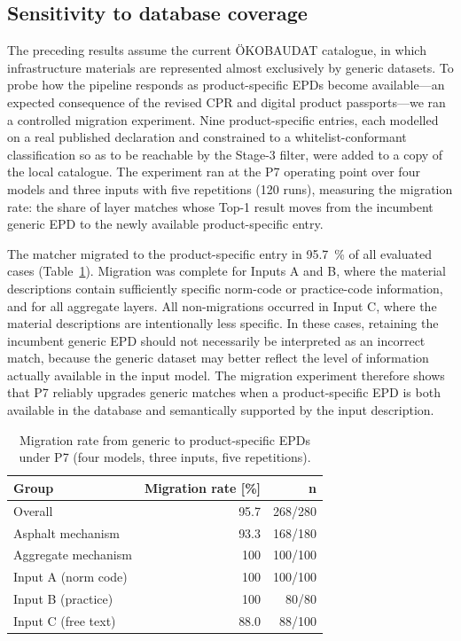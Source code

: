 \documentclass[10pt, a4paper, twocolumn]{article}
\begin{document}
\subsection{Sensitivity to database coverage}
\label{sec:coverage}

The preceding results assume the current \"OKOBAUDAT catalogue, in which
infrastructure materials are represented almost exclusively by generic datasets.
To probe how the pipeline responds as product-specific EPDs become available---an
expected consequence of the revised CPR and digital product passports---we ran a
controlled migration experiment. Nine product-specific entries, each modelled on a
real published declaration and constrained to a whitelist-conformant classification
so as to be reachable by the Stage-3 filter, were added to a copy of the local
catalogue. The experiment ran at the P7 operating point over four models and three
inputs with five repetitions (120 runs), measuring the migration rate: the share of
layer matches whose Top-1 result moves from the incumbent generic EPD to the newly
available product-specific entry.

The matcher migrated to the product-specific entry in 95.7~\% of all evaluated cases (Table~\ref{tab:migration}). Migration was complete for Inputs A and B, where the material descriptions contain sufficiently specific norm-code or practice-code information, and for all aggregate layers. All non-migrations occurred in Input C, where the material descriptions are intentionally less specific. In these cases, retaining the incumbent generic EPD should not necessarily be interpreted as an incorrect match, because the generic dataset may better reflect the level of information actually available in the input model. The migration experiment therefore shows that P7 reliably upgrades generic matches when a product-specific EPD is both available in the database and semantically supported by the input description.


\begin{table}[htbp]
  \caption{Migration rate from generic to product-specific EPDs under P7
           (four models, three inputs, five repetitions).}
  \label{tab:migration}
  \centering
  \small
  \begin{tabular}{lrr}
    \toprule
    \textbf{Group} & \textbf{Migration rate [\%]} & \textbf{n} \\
    \midrule
    Overall               & 95.7 & 268/280 \\
    \;Asphalt mechanism   & 93.3 & 168/180 \\
    \;Aggregate mechanism & 100  & 100/100 \\
    Input A (norm code)   & 100  & 100/100 \\
    Input B (practice)    & 100  & 80/80   \\
    Input C (free text)   & 88.0 & 88/100  \\
    \bottomrule
  \end{tabular}
\end{table}
\end{document}
